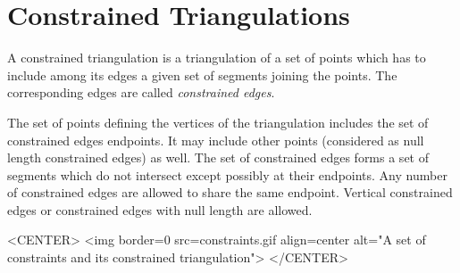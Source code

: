 \section{Constrained Triangulations}
\label{I1_Sect_Constrained}



A constrained triangulation is a triangulation of a set of points
which has to include among its edges 
a given set of segments joining the points. The corresponding 
edges are called {\em constrained edges}. 

The set of points defining the vertices of the triangulation
includes the set of constrained edges endpoints. It may include other points
(considered as null length constrained edges) as well.  The set of
constrained edges forms a set of segments which do not intersect
except possibly at their endpoints.  Any number of constrained edges
are allowed to share the same endpoint.  Vertical constrained edges or
constrained edges with null length are allowed.


\begin{ccTexOnly}
\begin{center}   \end{center}
\end{ccTexOnly}
 
\begin{ccHtmlOnly}
<CENTER>
<img border=0 src=constraints.gif align=center alt="A set of
constraints and its constrained triangulation">
</CENTER>
\end{ccHtmlOnly}


